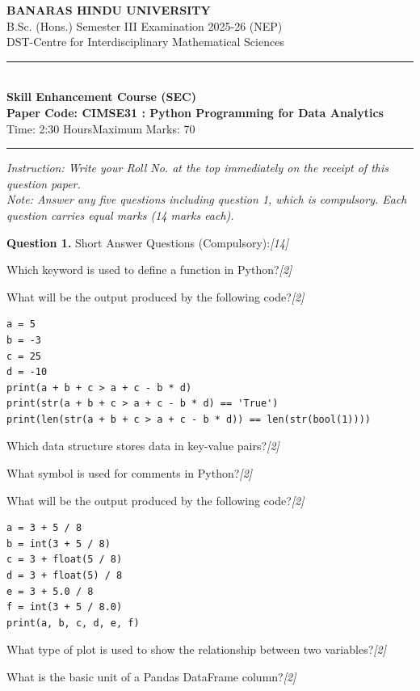 \documentclass[11pt,a4paper]{article}
\newcommand{\pts}[1]{\hfill   \textit{[#1]}}
\begin{document}
\begin{center}
  {\large\bfseries BANARAS HINDU UNIVERSITY}\\[2pt]
  {\normalsize B.Sc. (Hons.) Semester III Examination 2025-26 (NEP)}\\[4pt]
  {\normalsize DST-Centre for Interdisciplinary Mathematical Sciences}\\[6pt]
  \rule{0.8\linewidth}{0.5pt}\\[6pt]
  {\large\bfseries Skill Enhancement Course (SEC)}\\[4pt]
  {\large\bfseries Paper Code: CIMSE31 : Python Programming for Data Analytics}\\[4pt]
  {\normalsize Time: 2:30 Hours\hfill Maximum Marks: 70}
\end{center}

\rule{\linewidth}{0.4pt}

\smallskip



\noindent   \textit{Instruction: Write your Roll No. at the top immediately on the receipt of this question paper.}\\[2pt]



\noindent   \textit{Note: Answer any five questions including question 1, which is compulsory. Each question carries equal marks (14 marks each).}

\bigskip




\noindent   \textbf{Question 1.} Short Answer Questions (Compulsory):\pts{14}

\begin{parts}
  \item Which keyword is used to define a function in Python?\pts{2}
  \item What will be the output produced by the following code?\pts{2}

\begin{verbatim}
a = 5
b = -3
c = 25
d = -10
print(a + b + c > a + c - b * d)
print(str(a + b + c > a + c - b * d) == 'True')
print(len(str(a + b + c > a + c - b * d)) == len(str(bool(1))))
\end{verbatim}
  \item Which data structure stores data in key-value pairs?\pts{2}
  \item What symbol is used for comments in Python?\pts{2}
  \item What will be the output produced by the following code?\pts{2}

\begin{verbatim}
a = 3 + 5 / 8
b = int(3 + 5 / 8)
c = 3 + float(5 / 8)
d = 3 + float(5) / 8
e = 3 + 5.0 / 8
f = int(3 + 5 / 8.0)
print(a, b, c, d, e, f)
\end{verbatim}
  \item What type of plot is used to show the relationship between two variables?\pts{2}
  \item What is the basic unit of a Pandas DataFrame column?\pts{2}
\end{parts}
\end{document}
